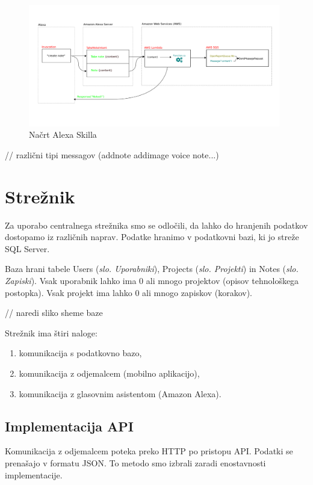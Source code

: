 \documentclass[a4paper, 12pt]{book}
\begin{document}
\begin{figure}[H]
\begin{center}
\includegraphics[width=11cm]{skill}
\end{center}
\caption{Načrt Alexa Skilla}
\label{skill}
\end{figure}

// različni tipi messagov (addnote addimage voice note...)

\section{Strežnik}

Za uporabo centralnega strežnika smo se odločili, da lahko do hranjenih podatkov dostopamo iz različnih naprav.
Podatke hranimo v podatkovni bazi, ki jo streže SQL Server.

Baza hrani tabele Users (\textit{slo. Uporabniki}), Projects (\textit{slo. Projekti}) in Notes (\textit{slo. Zapiski}).
Vsak uporabnik lahko ima 0 ali mnogo projektov (opisov tehnološkega postopka).
Vsak projekt ima lahko 0 ali mnogo zapiskov (korakov).

// naredi sliko sheme baze

\noindent Strežnik ima štiri naloge:
\begin{enumerate}
	\item komunikacija s podatkovno bazo,
	\item komunikacija z odjemalcem (mobilno aplikacijo),
	\item komunikacija z glasovnim asistentom (Amazon Alexa).
\end{enumerate}


\subsection{Implementacija API}

Komunikacija z odjemalcem poteka preko HTTP po pristopu API.
Podatki se prenašajo v formatu JSON.
To metodo smo izbrali zaradi enostavnosti implementacije.
\end{document}
